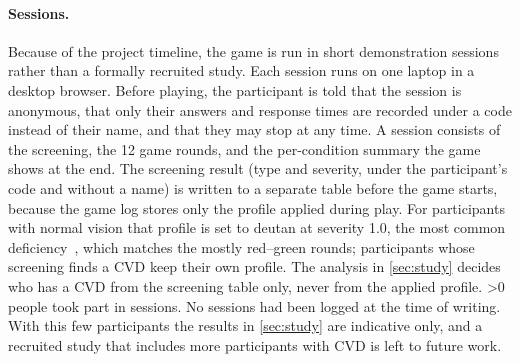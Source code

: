 \paragraph{Sessions.}
Because of the project timeline, the game is run in short demonstration sessions rather than
a formally recruited study. Each session runs on one laptop in a desktop browser. Before
playing, the participant is told that the session is anonymous, that only their answers and
response times are recorded under a code instead of their name, and that they may stop at any
time. A session consists of the screening, the 12 game rounds, and the per-condition summary
the game shows at the end. The screening result (type and severity, under the participant's
code and without a name) is written to a separate table before the game starts, because the
game log stores only the profile applied during play. For participants with normal vision that
profile is set to deutan at severity 1.0, the most common deficiency~\cite{birch2012}, which
matches the mostly red--green rounds; participants whose screening finds a CVD keep their own
profile. The analysis in \cref{sec:study} decides who has a CVD from the screening table only,
never from the applied profile.
\ifnum\StudyParticipants>0
\StudyParticipants{} people took part in \StudySessions{} sessions.
\else
No sessions had been logged at the time of writing.
\fi
With this few participants the results in \cref{sec:study} are indicative only, and a
recruited study that includes more participants with CVD is left to future work.
